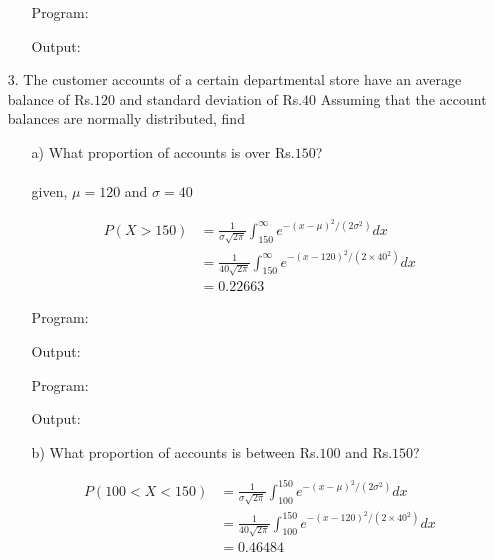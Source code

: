 \documentclass[a4paper,11pt,openright]{report}
\begin{document}
\begin{enumerate}
\begin{enumerate}
Program:

Output:


\end{enumerate}

\vspace{1cm}

\item[3.] The customer accounts of a certain departmental store have an average balance of
Rs.$120$ and standard deviation of Rs.$40$ Assuming that the account balances are normally
distributed, find

\vspace{1cm}

\begin{enumerate}

\item[a)] What proportion of accounts is over Rs.$150$? \\ \\
given, $\mu = 120$ and $\sigma = 40$

\begin{equation*}
\begin{split}
P(X > 150) &= \frac{1}{\sigma\sqrt{2\pi}} \int_{150}^{\infty} e^{-(x-\mu)^2/(2\sigma^{2})} dx \\
		   &= \frac{1}{40\sqrt{2\pi}} \int_{150}^{\infty} e^{-(x-120)^2/(2 \times 40^{2})} dx \\
		   &= 0.22663
\end{split}
\end{equation*}

Program:

Output:


Program:

Output:


\vspace{1cm}

\item[b)] What proportion of accounts is between Rs.$100$ and Rs.$150$?

\begin{equation*}
\begin{split}
P(100 < X < 150) &= \frac{1}{\sigma\sqrt{2\pi}} \int_{100}^{150} e^{-(x-\mu)^2/(2\sigma^{2})} dx \\
		&= \frac{1}{40\sqrt{2\pi}} \int_{100}^{150} e^{-(x-120)^2/(2 \times 40^{2})} dx \\
		&= 0.46484
\end{split}
\end{equation*}


\end{enumerate}
\end{enumerate}
\end{document}
